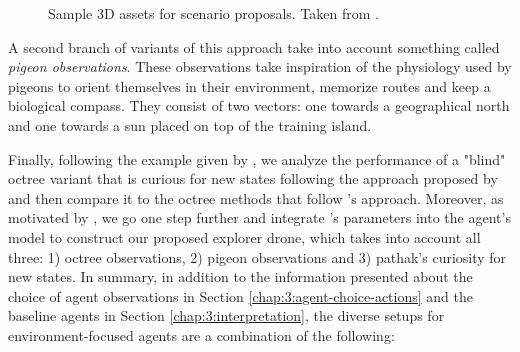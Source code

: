\begin{figure}[!ht]
    \centering
    \caption{Sample 3D assets for scenario proposals. Taken from \cite{unity-asset-store}.}
    \label{fig:unity-my-3d-envs}
\end{figure}


A second branch of variants of this approach take into account something called \textit{pigeon observations}. These observations take inspiration of the physiology used by pigeons to orient themselves in their environment, memorize routes and keep a biological compass. They consist of two vectors: one towards a geographical north and one towards a sun placed on top of the training island. 

Finally, following the example given by \textcite{chaplot2020semantic}, we analyze the performance of a "blind" octree variant that is curious for new states following the approach proposed by  \textcite{pathak2017curiosity} and then compare it to the octree methods that follow \textcite{chen2019learning}'s approach. Moreover, as motivated by \textcite{github-unity-mlagents-toolkit}, we go one step further and integrate \textcite{pathak2017curiosity}'s parameters into the agent's model to construct our proposed explorer drone, which takes into account all three: 1) octree observations, 2) pigeon observations and 3) pathak's curiosity for new states. In summary, in addition to the information presented about the choice of agent observations in Section \ref{chap:3:agent-choice-actions} and the baseline agents in Section \ref{chap:3:interpretation}, the diverse setups for environment-focused agents are a combination of the following:

